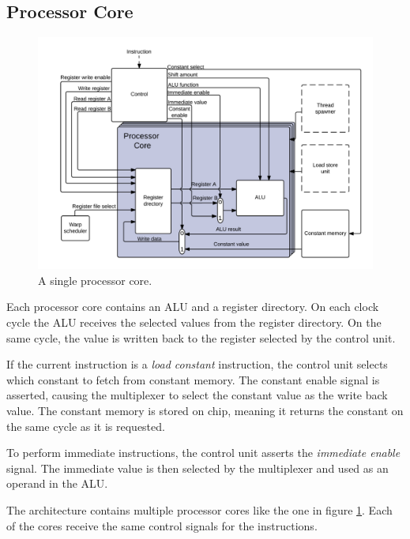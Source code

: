 \subsection{Processor Core}

\begin{figure}[H]
	\centering
	\includegraphics[width=1.2\textwidth]{../gpu/diagrams/processor_core.png}
	\caption{A single processor core.}
	\label{fig:processor_core}
\end{figure}

Each processor core contains an ALU and a register directory.
On each clock cycle the ALU receives the selected values from the register directory.
On the same cycle, the value is written back to the register selected by the control unit.

If the current instruction is a \emph{load constant} instruction, the control unit selects which constant to fetch from constant memory.
The constant enable signal is asserted, causing the multiplexer to select the constant value as the write back value.
The constant memory is stored on chip, meaning it returns the constant on the same cycle as it is requested.

To perform immediate instructions, the control unit asserts the \emph{immediate enable} signal.
The immediate value is then selected by the multiplexer and used as an operand in the ALU.

The architecture contains multiple processor cores like the one in figure \ref{fig:processor_core}.
Each of the cores receive the same control signals for the instructions.